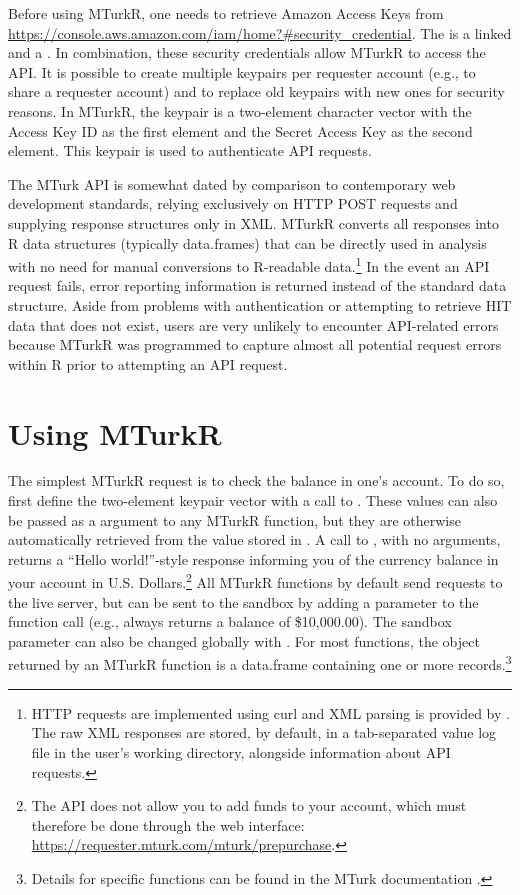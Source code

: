 Before using MTurkR, one needs to retrieve Amazon Access Keys from \url{https://console.aws.amazon.com/iam/home?#security_credential}. The  is a linked  and a . In combination, these security credentials allow MTurkR to access the API. It is possible to create multiple keypairs per requester account (e.g., to share a requester account) and to replace old keypairs with new ones for security reasons. In MTurkR, the keypair is a two-element character vector with the Access Key ID as the first element and the Secret Access Key as the second element. This keypair is used to authenticate API requests.

The MTurk API is somewhat dated by comparison to contemporary web development standards, relying exclusively on HTTP POST requests and supplying response structures only in XML. MTurkR converts all responses into R data structures (typically data.frames) that can be directly used in analysis with no need for manual conversions to R-readable data.\footnote{HTTP requests are implemented using curl \citep{Ooms2015} and XML parsing is provided by  \citep{Lang2012b}. The raw XML responses are stored, by default, in a tab-separated value log file in the user's working directory, alongside information about API requests.} In the event an API request fails, error reporting information is returned instead of the standard data structure. Aside from problems with authentication or attempting to retrieve HIT data that does not exist, users are very unlikely to encounter API-related errors because MTurkR was programmed to capture almost all potential request errors within R prior to attempting an API request.

\section{Using MTurkR}
The simplest MTurkR request is to check the balance in one's account. To do so, first define the two-element keypair vector with a call to . These values can also be passed as a  argument to any MTurkR function, but they are otherwise automatically retrieved from the value stored in . A call to , with no arguments, returns a ``Hello world!''-style response informing you of the currency balance in your account in U.S. Dollars.\footnote{The API does not allow you to add funds to your account, which must therefore be done through the web interface: \url{https://requester.mturk.com/mturk/prepurchase}.} All MTurkR functions by default send requests to the live server, but can be sent to the sandbox by adding a  parameter to the function call (e.g.,  always returns a balance of \$10,000.00). The sandbox parameter can also be changed globally with . For most functions, the object returned by an MTurkR function is a data.frame containing one or more records.\footnote{Details for specific functions can be found in the MTurk documentation \citep{Leeper2012c}.}

